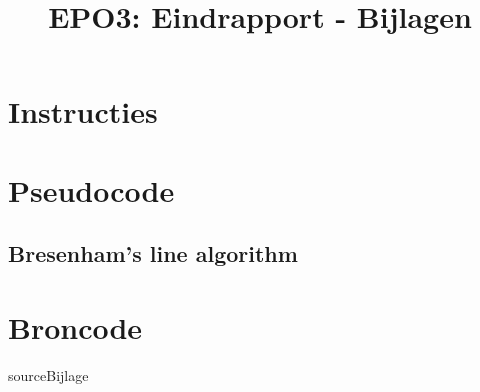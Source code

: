 \documentclass{scrreprt}
\author{}
\title{EPO3: Eindrapport - Bijlagen}
\begin{document}
\begin{appendices}

\chapter{Instructies}
\label{app:instructies}

\chapter{Pseudocode}
\label{app:pseudocode}
\section{Bresenham's line algorithm}
\label{appsec:pseudocode-bresenham-line}

\chapter{Broncode}
\label{app:source}
{sourceBijlage}

\end{appendices}
\end{document}
